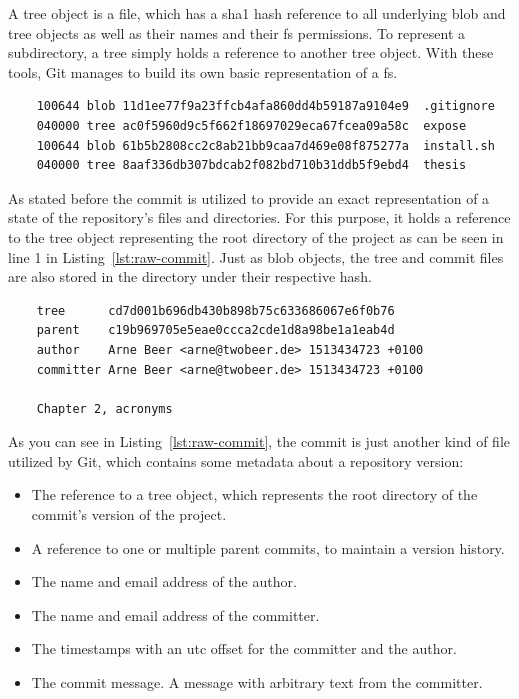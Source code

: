 A tree object is a file, which has a \ac{sha1} hash reference to all underlying blob and tree objects as well as their names and their \ac{fs} permissions.
To represent a subdirectory, a tree simply holds a reference to another tree object.
With these tools, Git manages to build its own basic representation of a \ac{fs}.

\begin{verbatim}
    100644 blob 11d1ee77f9a23ffcb4afa860dd4b59187a9104e9  .gitignore
    040000 tree ac0f5960d9c5f662f18697029eca67fcea09a58c  expose
    100644 blob 61b5b2808cc2c8ab21bb9caa7d469e08f875277a  install.sh
    040000 tree 8aaf336db307bdcab2f082bd710b31ddb5f9ebd4  thesis
\end{verbatim}
\begingroup
{}
\endgroup

As stated before the commit is utilized to provide an exact representation of a state of the repository's files and directories.
For this purpose, it holds a reference to the tree object representing the root directory of the project as can be seen in line 1 in Listing~\ref{lst:raw-commit}.
Just as blob objects, the tree and commit files are also stored in the  directory under their respective hash.

\begin{verbatim}
    tree      cd7d001b696db430b898b75c633686067e6f0b76
    parent    c19b969705e5eae0ccca2cde1d8a98be1a1eab4d
    author    Arne Beer <arne@twobeer.de> 1513434723 +0100
    committer Arne Beer <arne@twobeer.de> 1513434723 +0100

    Chapter 2, acronyms
\end{verbatim}
\begingroup
{}
\endgroup

As you can see in Listing~\ref{lst:raw-commit}, the commit is just another kind of file utilized by Git, which contains some metadata about a repository version:

\begin{itemize}
    \item The reference to a tree object, which represents the root directory of the commit's version of the project.
    \item A reference to one or multiple parent commits, to maintain a version history.
    \item The name and email address of the author.
    \item The name and email address of the committer.
    \item The timestamps with an \ac{utc} offset for the committer and the author.
    \item The commit message. A message with arbitrary text from the committer.
\end{itemize}

